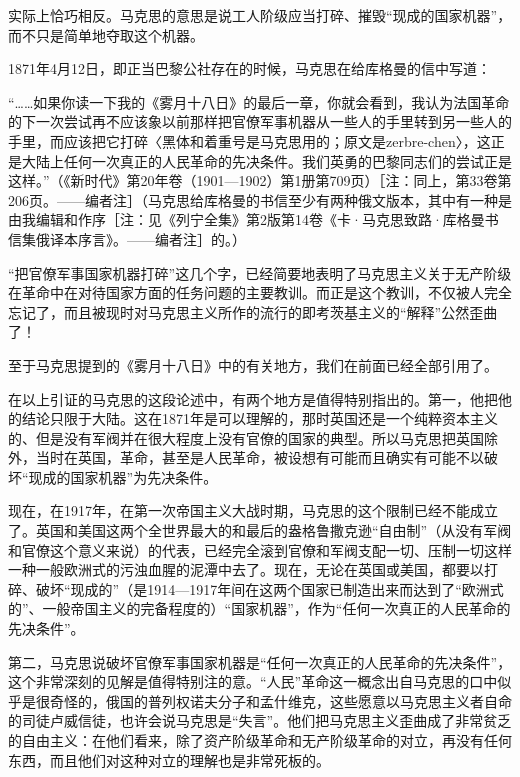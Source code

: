 \documentclass[UTF8, 12pt, a4paper]{ctexrep}
\begin{document}
实际上恰巧相反。马克思的意思是说工人阶级应当打碎、摧毁“现成的国家机器”，而不只是简单地夺取这个机器。

1871年4月12日，即正当巴黎公社存在的时候，马克思在给库格曼的信中写道：

“……如果你读一下我的《雾月十八日》的最后一章，你就会看到，我认为法国革命的下一次尝试再不应该象以前那样把官僚军事机器从一些人的手里转到另一些人的手里，而应该把它打碎〈黑体和着重号是马克思用的；原文是zerbre-chen〉，这正是大陆上任何一次真正的人民革命的先决条件。我们英勇的巴黎同志们的尝试正是这样。”（《新时代》第20年卷（1901—1902）第1册第709页）［注：同上，第33卷第206页。——编者注］（马克思给库格曼的书信至少有两种俄文版本，其中有一种是由我编辑和作序［注：见《列宁全集》第2版第14卷《卡·马克思致路·库格曼书信集俄译本序言》。——编者注］的。）

“把官僚军事国家机器打碎”这几个字，已经简要地表明了马克思主义关于无产阶级在革命中在对待国家方面的任务问题的主要教训。而正是这个教训，不仅被人完全忘记了，而且被现时对马克思主义所作的流行的即考茨基主义的“解释”公然歪曲了！

至于马克思提到的《雾月十八日》中的有关地方，我们在前面已经全部引用了。

在以上引证的马克思的这段论述中，有两个地方是值得特别指出的。第一，他把他的结论只限于大陆。这在1871年是可以理解的，那时英国还是一个纯粹资本主义的、但是没有军阀并在很大程度上没有官僚的国家的典型。所以马克思把英国除外，当时在英国，革命，甚至是人民革命，被设想有可能而且确实有可能不以破坏“现成的国家机器”为先决条件。

现在，在1917年，在第一次帝国主义大战时期，马克思的这个限制已经不能成立了。英国和美国这两个全世界最大的和最后的盎格鲁撒克逊“自由制”（从没有军阀和官僚这个意义来说）的代表，已经完全滚到官僚和军阀支配一切、压制一切这样一种一般欧洲式的污浊血腥的泥潭中去了。现在，无论在英国或美国，都要以打碎、破坏“现成的”（是1914—1917年间在这两个国家已制造出来而达到了“欧洲式的”、一般帝国主义的完备程度的）“国家机器”，作为“任何一次真正的人民革命的先决条件”。

第二，马克思说破坏官僚军事国家机器是“任何一次真正的人民革命的先决条件”，这个非常深刻的见解是值得特别注的意。“人民”革命这一概念出自马克思的口中似乎是很奇怪的，俄国的普列权诺夫分子和孟什维克，这些愿意以马克思主义者自命的司徒卢威信徒，也许会说马克思是“失言”。他们把马克思主义歪曲成了非常贫乏的自由主义：在他们看来，除了资产阶级革命和无产阶级革命的对立，再没有任何东西，而且他们对这种对立的理解也是非常死板的。
\end{document}
